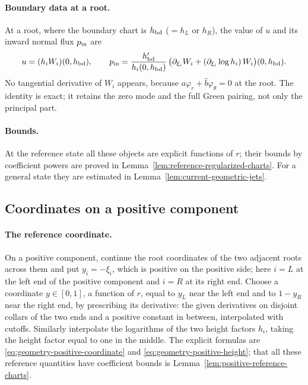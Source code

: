 \paragraph{Boundary data at a root.}
At a root, where the boundary chart is $h_{\rm bd}$ ($=h_L$ or $h_R$),
the value of $u$ and its inward normal flux $p_{\rm in}$ are
\begin{equation}\label{eq:fixed-strip-root-pair}
 u=(h_iW_i)(0,h_{\rm bd}),\qquad
 p_{\rm in}=\frac{h_{\rm bd}'}{h_i(0,h_{\rm bd})}\,
       \bigl(\partial_{\xi_i}W_i+(\partial_{\xi_i}\log h_i)\,W_i\bigr)
                                             (0,h_{\rm bd}) .
\end{equation}
No tangential derivative of $W_i$ appears, because
$a\varphi_r+\widehat b\varphi_\theta=0$ at the root. The identity is
exact; it retains the zero mode and the full Green pairing, not only
the principal part.

\paragraph{Bounds.}
At the reference state all these objects are explicit functions of
$r$; their bounds by coefficient powers are proved in
Lemma~\ref{lem:reference-regularized-charts}. For a general state
they are estimated in Lemma~\ref{lem:current-geometric-jets}.

\subsection{Coordinates on a positive component}
\label{subsec:positive-crossing}

\paragraph{The reference coordinate.}
On a positive component, continue the root coordinates of the two
adjacent roots across them and put $y_i=-\xi_i$, which is positive on
the positive side; here $i=L$ at the left end of the positive
component and $i=R$ at its right end. Choose a coordinate
$y\in[0,1]$, a function of $r$, equal to $y_L$ near the left end and
to $1-y_R$ near the right end, by prescribing its derivative: the
given derivatives on disjoint collars of the two ends and a positive
constant in between, interpolated with cutoffs. Similarly
interpolate the logarithms of the two height factors $h_i$, taking the
height factor equal to one in the middle. The explicit formulas are
\eqref{eq:geometry-positive-coordinate} and
\eqref{eq:geometry-positive-height}; that all these reference
quantities have coefficient bounds is
Lemma~\ref{lem:positive-reference-charts}.

